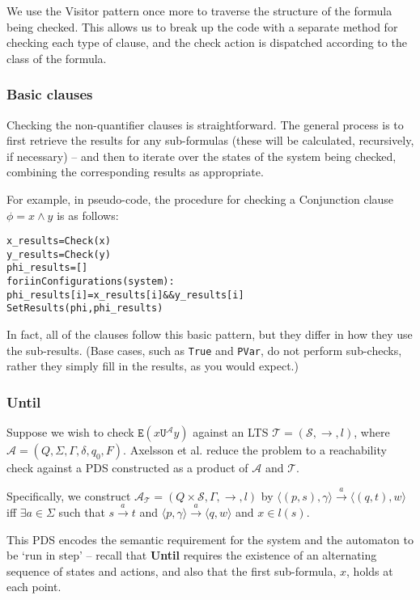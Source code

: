 \documentclass[11pt]{article}
\theoremstyle{definition}
\begin{document}
We use the Visitor pattern once more to traverse the structure of the formula
being checked. This allows us to break up the code with a separate method for
checking each type of clause, and the check action is dispatched according to
the class of the formula.

\subsubsection{Basic clauses}

Checking the non-quantifier clauses is straightforward. The general process is
to first retrieve the results for any sub-formulas (these will be calculated,
recursively, if necessary) -- and then to iterate over the states of the system
being checked, combining the corresponding results as appropriate.

For example, in pseudo-code, the procedure for checking a Conjunction clause $\phi = x \wedge y$ is as follows:
\begin{alltt}
x_results = Check(x)
y_results = Check(y)
phi_results = []
for i in Configurations(system):
   phi_results[i] = x_results[i] && y_results[i]
SetResults(phi, phi_results)
\end{alltt}

In fact, all of the clauses follow this basic pattern, but they differ in how
they use the sub-results. (Base cases, such as \texttt{True} and \texttt{PVar}, do not perform sub-checks, rather they simply fill in the results, as you would expect.)

\subsubsection{Until}

Suppose we wish to check $\texttt{E}(x\texttt{U}^\mathcal{A}y)$ against an LTS
$\mathcal{T} = (\mathcal{S}, \rightarrow, l)$, where $\mathcal{A} = (Q, \Sigma,
\Gamma, \delta, q_0, F)$. Axelsson et al. reduce the problem to a reachability
check against a PDS constructed as a product of $\mathcal{A}$ and
$\mathcal{T}$.\cite{Kreutzer10}

Specifically, we construct $\mathcal{A_T} = (Q \times \mathcal{S}, \Gamma, \rightarrow, l)$
by $ \langle (p, s), \gamma \rangle \xrightarrow{a} \langle (q, t), w \rangle $ iff $\exists a \in \Sigma$ such that $s \xrightarrow{a} t$ and $\langle p, \gamma \rangle \xrightarrow{a} \langle q, w \rangle$ and $x \in l(s)$.

This PDS encodes the semantic requirement for the system and the automaton to
be `run in step' -- recall that \textbf{Until} requires the existence of an
alternating sequence of states and actions, and also that the first
sub-formula, $x$, holds at each point.
\end{document}
